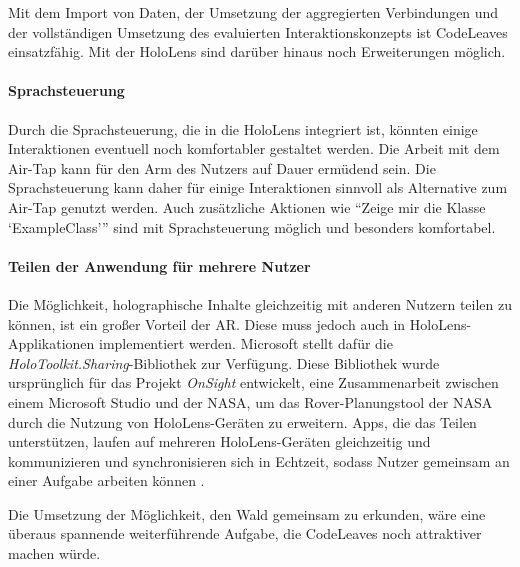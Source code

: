 Mit dem Import von Daten, der Umsetzung der aggregierten Verbindungen und der vollständigen Umsetzung des evaluierten Interaktionskonzepts ist CodeLeaves einsatzfähig. Mit der HoloLens sind darüber hinaus noch Erweiterungen möglich.

\paragraph*{Sprachsteuerung}

Durch die Sprachsteuerung, die in die HoloLens integriert ist, könnten einige Interaktionen eventuell noch komfortabler gestaltet werden. Die Arbeit mit dem Air-Tap kann für den Arm des Nutzers auf Dauer ermüdend sein. Die Sprachsteuerung kann daher für einige Interaktionen sinnvoll als Alternative zum Air-Tap genutzt werden. Auch zusätzliche Aktionen wie "`Zeige mir die Klasse \enquote*{ExampleClass}"' sind mit Sprachsteuerung möglich und besonders komfortabel.

\paragraph*{Teilen der Anwendung für mehrere Nutzer}
Die Möglichkeit, holographische Inhalte gleichzeitig mit anderen Nutzern teilen zu können, ist ein großer Vorteil der AR. Diese muss jedoch auch in HoloLens-Applikationen implementiert werden. Microsoft stellt dafür die \textit{HoloToolkit.Sharing}-Bibliothek zur Verfügung. Diese Bibliothek wurde ursprünglich für das Projekt \textit{OnSight} entwickelt, eine Zusammenarbeit zwischen einem Microsoft Studio und der NASA, um das Rover-Planungstool der NASA durch die Nutzung von HoloLens-Geräten zu erweitern. Apps, die das Teilen unterstützen, laufen auf mehreren HoloLens-Geräten gleichzeitig und kommunizieren und synchronisieren sich in Echtzeit, sodass Nutzer gemeinsam an einer Aufgabe arbeiten können \cite{microsoft2017sharing}.

Die Umsetzung der Möglichkeit, den Wald gemeinsam zu erkunden, wäre eine überaus spannende weiterführende Aufgabe, die CodeLeaves noch attraktiver machen würde.\\
